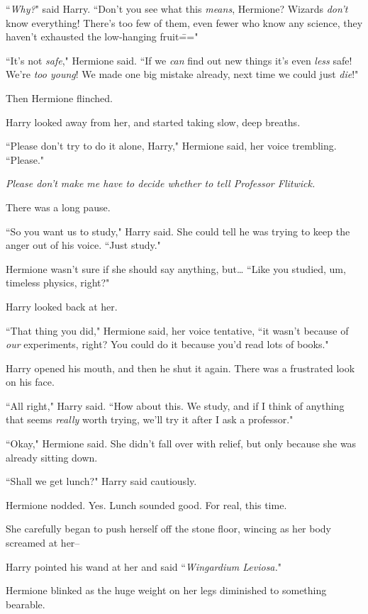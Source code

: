 ``\emph{Why?}" said Harry. ``Don't you see what this \emph{means}, Hermione? Wizards \emph{don't} know everything! There's too few of them, even fewer who know any science, they haven't exhausted the low-hanging fruit\==="

``It's not \emph{safe}," Hermione said. ``If we \emph{can} find out new things it's even \emph{less} safe! We're \emph{too young}! We made one big mistake already, next time we could just \emph{die}!"

Then Hermione flinched.

Harry looked away from her, and started taking slow, deep breaths.

``Please don't try to do it alone, Harry," Hermione said, her voice trembling. ``Please."

\emph{Please don't make me have to decide whether to tell Professor Flitwick.}

There was a long pause.

``So you want us to study," Harry said. She could tell he was trying to keep the anger out of his voice. ``Just study."

Hermione wasn't sure if she should say anything, but{\ldots} ``Like you studied, um, timeless physics, right?"

Harry looked back at her.

``That thing you did," Hermione said, her voice tentative, ``it wasn't because of \emph{our} experiments, right? You could do it because you'd read lots of books."

Harry opened his mouth, and then he shut it again. There was a frustrated look on his face.

``All right," Harry said. ``How about this. We study, and if I think of anything that seems \emph{really} worth trying, we'll try it after I ask a professor."

``Okay," Hermione said. She didn't fall over with relief, but only because she was already sitting down.

``Shall we get lunch?" Harry said cautiously.

Hermione nodded. Yes. Lunch sounded good. For real, this time.

She carefully began to push herself off the stone floor, wincing as her body screamed at her\---

Harry pointed his wand at her and said ``\emph{Wingardium Leviosa.}"

Hermione blinked as the huge weight on her legs diminished to something bearable.

